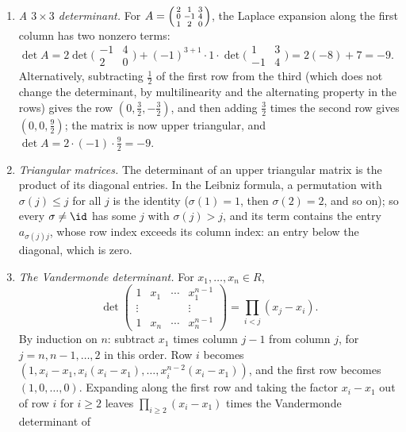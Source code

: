 \begin{example}\label{linear-algebra:example-determinants}
\begin{enumerate}
\item \emph{A $3 \times 3$ determinant.} For $A = \Bigl(\begin{smallmatrix}2 & 1 & 3\\ 0 & -1 & 4\\ 1 & 2 & 0\end{smallmatrix}\Bigr)$, the Laplace expansion along the first column has two nonzero terms:
$\det A = 2\det\bigl(\begin{smallmatrix}-1 & 4\\ 2 & 0\end{smallmatrix}\bigr) + (-1)^{3+1}\cdot1\cdot\det\bigl(\begin{smallmatrix}1 & 3\\ -1 & 4\end{smallmatrix}\bigr) = 2(-8) + 7 = -9$. Alternatively,
subtracting $\frac12$ of the first row from the third (which does not change the determinant, by multilinearity and the alternating property in the rows) gives the row $(0, \frac32, -\frac32)$, and then
adding $\frac32$ times the second row gives $(0, 0, \frac92)$; the matrix is now upper triangular, and $\det A = 2 \cdot (-1) \cdot \frac92 = -9$.
\item \emph{Triangular matrices.} The determinant of an upper triangular matrix is the product of its diagonal entries. In the Leibniz formula, a permutation with $\sigma(j) \leq j$ for all $j$ is the
identity ($\sigma(1) = 1$, then $\sigma(2) = 2$, and so on); so every $\sigma \neq \id$ has some $j$ with $\sigma(j) > j$, and its term contains the entry $a_{\sigma(j)j}$, whose row index exceeds its column
index: an entry below the diagonal, which is zero.
\item \emph{The Vandermonde determinant.} For $x_1, \ldots, x_n \in R$,
\[
\det\begin{pmatrix}1 & x_1 & \cdots & x_1^{n-1}\\ \vdots & & & \vdots\\ 1 & x_n & \cdots & x_n^{n-1}\end{pmatrix} = \prod_{i<j}(x_j - x_i).
\]
By induction on $n$: subtract $x_1$ times column $j - 1$ from column $j$, for $j = n, n - 1, \ldots, 2$ in this order. Row $i$ becomes $(1, x_i - x_1, x_i(x_i - x_1), \ldots, x_i^{n-2}(x_i - x_1))$, and the
first row becomes $(1, 0, \ldots, 0)$. Expanding along the first row and taking the factor $x_i - x_1$ out of row $i$ for $i \geq 2$ leaves $\prod_{i \geq 2}(x_i - x_1)$ times the Vandermonde determinant of

\end{enumerate}
\end{example}
